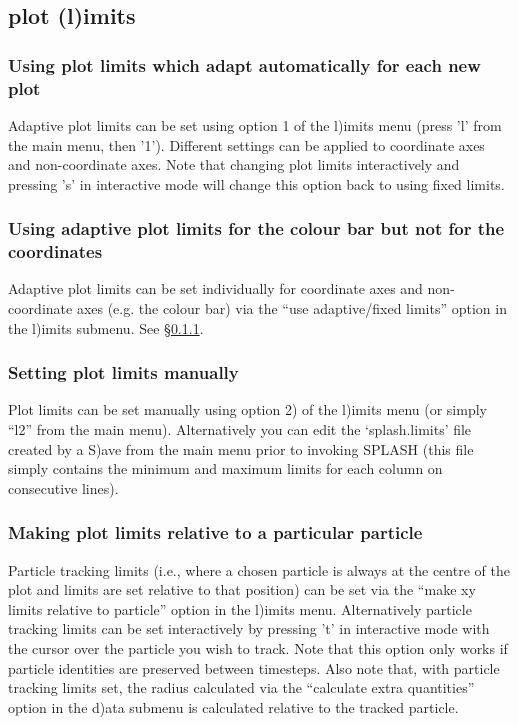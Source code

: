 \documentclass[a4paper,10pt]{article}
\newcommand{\splash}{\textsc{SPLASH }}
\begin{document}
\subsection{plot (l)imits}

\subsubsection{ Using plot limits which adapt automatically for each new plot}
\label{sec:adapt}
 Adaptive plot limits can be set using option 1 of the l)imits menu (press 'l' from the main menu, then '1'). Different settings can be applied to coordinate axes and non-coordinate axes. Note that changing plot limits interactively and pressing 's' in interactive mode will change this option back to using fixed limits.

\subsubsection{ Using adaptive plot limits for the colour bar but not for the coordinates}
 Adaptive plot limits can be set individually for coordinate axes and non-coordinate axes (e.g. the colour bar) via the ``use adaptive/fixed limits'' option in the l)imits submenu. See \S\ref{sec:adapt}. 

\subsubsection{ Setting plot limits manually}
 Plot limits can be set manually using option 2) of the l)imits menu (or simply ``l2'' from the main menu). Alternatively you can edit the `splash.limits' file created by a S)ave from the main menu prior to invoking \splash (this file simply contains the minimum and maximum limits for each column on consecutive lines).

\subsubsection{ Making plot limits relative to a particular particle}
\label{sec:track}
 Particle tracking limits (i.e., where a chosen particle is always at the centre of the plot and limits are set relative to that position) can be set via the ``make xy limits relative to particle'' option in the l)imits menu. Alternatively particle tracking limits can be set interactively by pressing 't' in interactive mode with the cursor over the particle you wish to track. Note that this option only works if particle identities are preserved between timesteps. Also note that, with particle tracking limits set, the radius calculated via the ``calculate extra quantities'' option in the d)ata submenu is calculated relative to the tracked particle.
\end{document}
